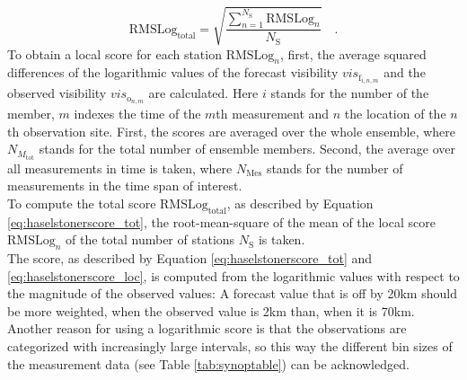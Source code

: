 \begin{equation}
    \mathrm{RMSLog_{total}}=   \sqrt{\frac{ \sum_{n=1}^{N_\mathrm{S}} \mathrm{RMSLog}_{n} } {N_\mathrm{S}} } \quad .
    \label{eq:haselstonerscore_tot}
\end{equation}
To obtain a local score for each station $\mathrm{RMSLog}_{n}$, first, the average squared differences of the logarithmic values of the forecast visibility $vis_{\mathrm{f}_{i,n,m}}$ and the observed visibility $vis_{\mathrm{o}_{n,m}}$ are calculated. Here $i$ stands for the number of the member, $m$ indexes the time of the $m$th measurement and $n$ the location of the $n$th observation site.
First, the scores are averaged over the whole ensemble, where $N_{M_\mathrm{tot}}$ stands for the total number of ensemble members. Second, the average over all measurements in time is taken, where $N_\mathrm{Mes}$ stands for the number of measurements in the time span of interest.\\
To compute the total score $\mathrm{RMSLog_{total}}$, as described by Equation \eqref{eq:haselstonerscore_tot}, the root-mean-square of the mean of the local score $\mathrm{RMSLog}_{n}$ of the total number of stations $N_\mathrm{S}$ is taken.\\
The score, as described by Equation \eqref{eq:haselstonerscore_tot} and \eqref{eq:haselstonerscore_loc}, is computed from the logarithmic values with respect to the magnitude of the observed values: A forecast value that is off by 20km should be more weighted, when the observed value is 2km than, when it is 70km. Another reason for using a logarithmic score is that the observations are categorized with increasingly large intervals, so this way the different bin sizes of the measurement data (see Table \ref{tab:synoptable}) can be acknowledged.
\\

